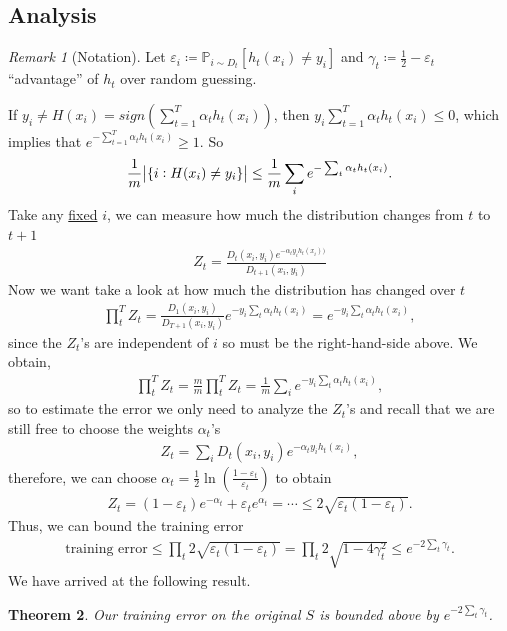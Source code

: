 \documentclass[12pt, letterpaper]{article}
\numberwithin{equation}{section} %
\newcommand{\ul}{\underline}
\newcommand{\mb}{\mathbb}
\newcommand{\ve}{\varepsilon}
\newtheorem{theorem}{Theorem}[section]
\theoremstyle{definition}
\theoremstyle{remark}
\newtheorem{remark}[theorem]{Remark}
\begin{document}
\subsection*{Analysis}
\begin{remark}[Notation]
Let $\ve_i \coloneqq \mb P_{i\sim D_t}[h_t(x_i)\ne y_i]$ and $\gamma_t \coloneqq \frac12 -\ve_t$ ``advantage'' of $h_t$ over random guessing.
\end{remark}
If $y_i\ne H(x_i) = sign\left(\sum_{t=1}^T\alpha_th_t(x_i)\right)$, then $y_i\sum_{t=1}^T\alpha_th_t(x_i) \leq 0$, which implies that $e^{-\sum_{t=1}^T\alpha_th_t(x_i)}\geq 1$. So
\begin{align}\label{star}
\frac1m\abs{\lbrace i : H(x_i) \ne y_i \rbrace} \leq \frac1m \sum_ie^{-\sum_t\alpha_th_t(x_i)}.
\end{align}
Take any \ul{fixed} $i$, we can measure how much the distribution changes from $t$ to $t+1$
\begin{align}
 Z_t = \frac{D_t(x_i, y_i)e^{-\alpha_ty_ih_t(x_i))}}{D_{t+1}(x_i, y_i)}
\end{align}
Now we want take a look at how much the distribution has changed over $t$
\begin{align}
\prod_{t}^T Z_t = \frac{D_1(x_i, y_i)}{D_{T+1}(x_i, y_i)} e^{-y_i\sum_t\alpha_th_t(x_i)} = e^{-y_i\sum_t\alpha_th_t(x_i)},
\end{align}
since the $Z_t$'s are independent of $i$ so must be the right-hand-side above. We obtain,
\begin{align}
\prod_{t}^T Z_t = \frac mm \prod_{t}^T Z_t = \frac1 m \sum_i e^{-y_i\sum_t\alpha_th_t(x_i)},
\end{align}
so to estimate the error we only need to analyze the $Z_t$'s and recall that we are still free to choose the weights $\alpha_t$'s
\begin{align}
Z_t = \sum_i D_t(x_i, y_i)e^{-\alpha_ty_ih_t(x_i)},
\end{align}
therefore, we can choose $\alpha_t = \frac12 \ln\left(\frac{1-\ve_t}{\ve_t}\right)$ to obtain
\begin{align}
Z_t = (1-\ve_t)e^{-\alpha_t} + \ve_te^{\alpha_t} = \cdots \leq 2\sqrt{\ve_t(1-\ve_t)}.
\end{align}
Thus, we can bound the training error
\begin{align}
\textrm{training error} \leq \prod_t2\sqrt{\ve_t(1-\ve_t)} = \prod_t2\sqrt{1 - 4\gamma_t^2} \leq e^{-2\sum_t\gamma_t}.
\end{align}
We have arrived at the following result.
\begin{theorem}
Our training error on the original $S$ is bounded above by  $e^{-2\sum_t\gamma_t}$.
\end{theorem}
\end{document}
